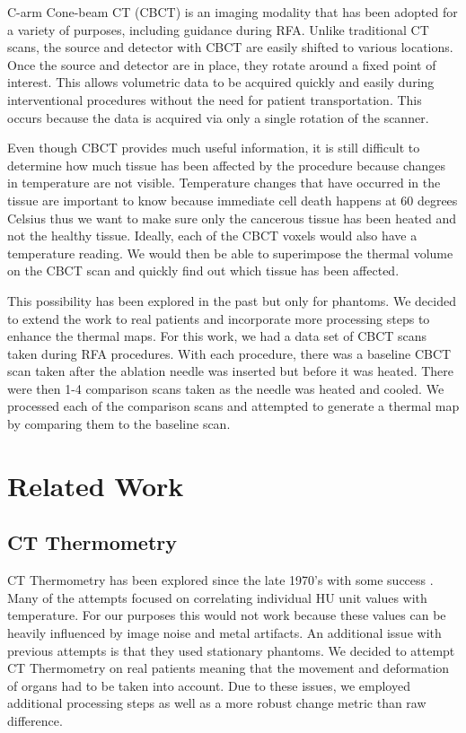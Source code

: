 \documentclass[]{spie}  %
\begin{document}
C-arm Cone-beam CT (CBCT) is an imaging modality that has been adopted for a variety of purposes\cite{Orth08}, including guidance during RFA. Unlike traditional CT scans, the source and detector with CBCT are easily shifted to various locations. Once the source and detector are in place, they rotate around a fixed point of interest. This allows volumetric data to be acquired quickly and easily during interventional procedures without the need for patient transportation. This occurs because the data is acquired via only a single rotation of the scanner.

Even though CBCT provides much useful information, it is still difficult to determine how much tissue has been affected by the procedure because changes in temperature are not visible. Temperature changes that have occurred in the tissue are important to know\cite{Li13} because immediate cell death happens at 60 degrees Celsius thus we want to make sure only the cancerous tissue has been heated and not the healthy tissue. Ideally, each of the CBCT voxels would also have a temperature reading. We would then be able to superimpose the thermal volume on the CBCT scan and quickly find out which tissue has been affected.

This possibility has been explored in the past \cite{Li13} but only for phantoms. We decided to extend the work to real patients and incorporate more processing steps to enhance the thermal maps. For this work, we had a data set of CBCT scans taken during RFA procedures. With each procedure, there was a baseline CBCT scan taken after the ablation needle was inserted but before it was heated. There were then 1-4 comparison scans taken as the needle was heated and cooled. We processed each of the comparison scans and attempted to generate a thermal map by comparing them to the baseline scan.

\section{Related Work}

\subsection{CT Thermometry}

CT Thermometry has been explored since the late 1970's with some success \cite{Fani14}. Many of the attempts focused on correlating individual HU unit values with temperature. For our purposes this would not work because these values can be heavily influenced by image noise and metal artifacts. An additional issue with previous attempts is that they used stationary phantoms. We decided to attempt CT Thermometry on real patients meaning that the movement and deformation of organs had to be taken into account. Due to these issues, we employed additional processing steps as well as a more robust change metric than raw difference.
\end{document}

